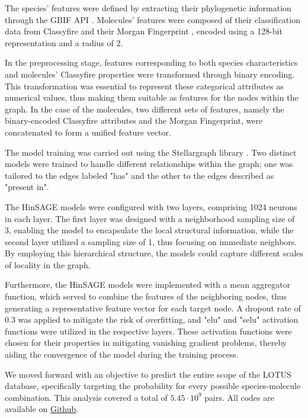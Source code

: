 \documentclass[
11pt, %
oneside, %
english, %
singlespacing, %
headsepline, %
chapterinoneline, %
]{MastersDoctoralThesis} %
\begin{document}
The species' features were defined by extracting their phylogenetic information through the GBIF API \cite{GBIF, GbifPygbif2023}. Molecules' features were composed of their classification data from Classyfire \cite{djoumboufeunangClassyFireAutomatedChemical2016} and their Morgan Fingerprint \cite{rogersExtendedConnectivityFingerprints2010}, encoded using a 128-bit representation and a radius of 2.

In the preprocessing stage, features corresponding to both species characteristics and molecules' Classyfire properties were transformed through binary encoding. This transformation was essential to represent these categorical attributes as numerical values, thus making them suitable as features for the nodes within the graph. In the case of the molecules, two different sets of features, namely the binary-encoded Classyfire attributes and the Morgan Fingerprint, were concatenated to form a unified feature vector.

The model training was carried out using the Stellargraph library \cite{StellarGraphMachineLearning2018}. Two distinct models were trained to handle different relationships within the graph; one was tailored to the edges labeled "has" and the other to the edges described as "present in".

The HinSAGE models were configured with two layers, comprising 1024 neurons in each layer. The first layer was designed with a neighborhood sampling size of 3, enabling the model to encapsulate the local structural information, while the second layer utilized a sampling size of 1, thus focusing on immediate neighbors. By employing this hierarchical structure, the models could capture different scales of locality in the graph.

Furthermore, the HinSAGE models were implemented with a mean aggregator function, which served to combine the features of the neighboring nodes, thus generating a representative feature vector for each target node. A dropout rate of 0.3 was applied to mitigate the risk of overfitting, and "elu" and "selu" activation functions were utilized in the respective layers. These activation functions were chosen for their properties in mitigating vanishing gradient problems, thereby aiding the convergence of the model during the training process. 

We moved forward with an objective to predict the entire scope of the LOTUS database, specifically targeting the probability for every possible species-molecule combination. This analysis covered a total of $5.45 \cdot 10^9$ pairs. All codes are available on \href{https://github.com/anticipated-lotus/GNN}{Github}.
\end{document}

